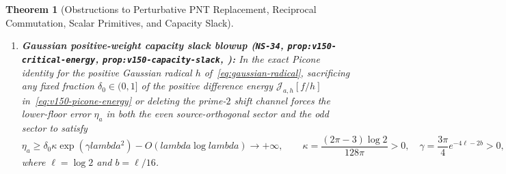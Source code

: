 \documentclass[11pt]{article}
\def\lambda{lambda}%
\newtheorem{theorem}{Theorem}[section]
\theoremstyle{remark}
\begin{document}
\begin{theorem}[Obstructions to Perturbative PNT Replacement, Reciprocal Commutation, Scalar Primitives, and Capacity Slack]
\begin{enumerate}[label=(\alph*)]
  \begin{equation}\label{eq:v137-rh-linear}
    \Delta(\beta_a) \ge \frac{1}{6\pi}, \qquad a\Delta(\beta_a) \ge \frac{a}{6\pi}, \qquad \inf_{\xi \in \mathbb{R}} \beta_a(\xi) \le -\frac{a}{6\pi^2},
  \end{equation}
  and \textbf{unconditionally} (without assuming RH),
  \begin{equation}\label{eq:v137-unconditional-div}
    \lim_{a \to \infty} a\Delta(\beta_a) = +\infty, \qquad \lim_{a \to \infty} \inf_{\xi \in \mathbb{R}} \beta_a(\xi) = -\infty,
  \end{equation}
  closing the scalar signed-primitive route to Theorem~\ref{thm:bounded-floor}.
  \item \textbf{Gaussian positive-weight capacity slack blowup (\texttt{NS-34}, \texttt{prop:v150-critical-energy}, \texttt{prop:v150-capacity-slack}, ):} In the exact Picone identity for the positive Gaussian radical $h$ of~\eqref{eq:gaussian-radical}, sacrificing any fixed fraction $\delta_0 \in (0,1]$ of the positive difference energy $\mathcal{J}_{a,h}[f/h]$ in~\eqref{eq:v150-picone-energy} or deleting the prime-$2$ shift channel forces the lower-floor error $\eta_a$ in both the even source-orthogonal sector and the odd sector to satisfy
  \begin{equation}\label{eq:v150-slack-blowup}
    \eta_a \ge \delta_0 \kappa \exp(\gamma\lambda^2) - O(\lambda\log\lambda) \longrightarrow +\infty, \qquad \kappa = \frac{(2\pi - 3)\log 2}{128\pi} > 0, \quad \gamma = \frac{3\pi}{4}e^{-4\ell - 2b} > 0,
  \end{equation}
  where $\ell = \log 2$ and $b = \ell/16$.
\end{enumerate}
\end{theorem}
\end{document}
